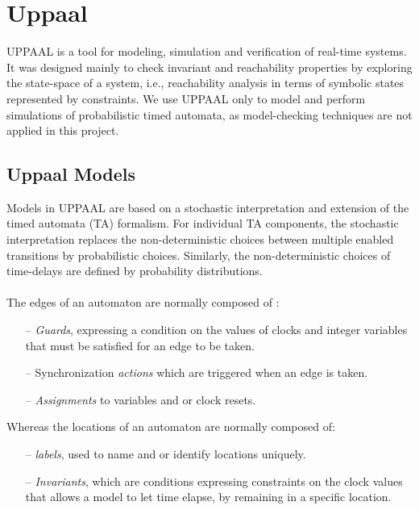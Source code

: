 \section{Uppaal}
UPPAAL is a tool for modeling, simulation and verification of real-time systems. It was designed mainly to check invariant and reachability properties by exploring the state-space of a system, i.e., reachability analysis in terms of symbolic states represented by constraints. \cite{uppaalNutshell} We use UPPAAL only to model and perform simulations of probabilistic timed automata, as model-checking techniques are not applied in this project. 

\subsection{Uppaal Models}
Models in UPPAAL are based on a stochastic interpretation and extension of the timed automata (TA) formalism. For individual TA components, the stochastic interpretation replaces the non-deterministic choices between multiple enabled transitions by probabilistic choices. Similarly, the non-deterministic choices of time-delays are defined by probability distributions. \cite{uppaalSmcTutorial}\\ \\
%
The edges of an automaton are normally composed of \cite{uppaalNutshell}: 
\begin{itemize}
	\item[--]
	\textit{Guards}, expressing a condition on the values of clocks and integer variables that must be satisfied for an edge to be taken. 
	\item[--]
	Synchronization \textit{actions} which are triggered when an edge is taken. 
	\item[--]
	\textit{Assignments} to variables and or clock resets. 
\end{itemize}

Whereas the locations of an automaton are normally composed of:
\begin{itemize}
	\item[--]
	\textit{labels}, used to name and or identify locations uniquely. 
	\item[--]
	\textit{Invariants}, which are conditions expressing constraints on the clock values that allows a model to let time elapse, by remaining in a specific location.
\end{itemize}


